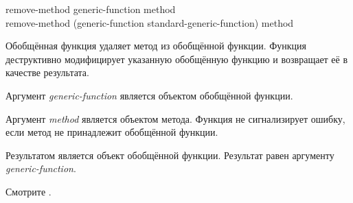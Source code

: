 \begin{defun}
remove-method generic-function method \\
remove-method (generic-function standard-generic-function) method

Обобщённая функция  удаляет метод из обобщённой
функции. Функция деструктивно модифицирует указанную обобщённую функцию и
возвращает её в качестве результата.

Аргумент \emph{generic-function} является объектом обобщённой функции.

Аргумент \emph{method} является объектом метода. Функция  не
сигнализирует ошибку, если метод не принадлежит обобщённой функции.

Результатом является объект обобщённой функции. Результат 
равен  аргументу \emph{generic-function}.

Смотрите .
\end{defun}

